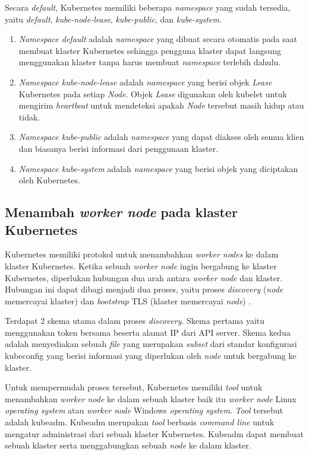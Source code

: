 Secara \emph{default}, Kubernetes memiliki beberapa \emph{namespace} yang sudah
tersedia, yaitu \emph{default}, \emph{kube-node-lease}, \emph{kube-public}, dan \emph{kube-system}.

\begin{enumerate}[itemsep=-0.2cm, topsep=-0.3cm]
  \item{\emph{Namespace default} adalah \emph{namespace} yang dibuat secara otomatis
      pada saat membuat klaster Kubernetes sehingga pengguna klaster dapat langsung
      menggunakan klaster tanpa harus membuat \emph{namespace} terlebih dahulu.
    }
  \item{\emph{Namespace kube-node-lease} adalah \emph{namespace} yang berisi objek \emph{Lease}
      Kubernetes pada setiap \emph{Node}. Objek \emph{Lease} digunakan oleh kubelet untuk
      mengirim \emph{heartbeat} untuk mendeteksi apakah \emph{Node} tersebut masih hidup atau tidak.
    }
  \item{\emph{Namespace kube-public} adalah \emph{namespace} yang dapat diakses oleh semua
      klien dan biasanya berisi informasi dari penggunaan klaster.
    }
  \item{\emph{Namespace kube-system} adalah \emph{namespace} yang berisi objek yang diciptakan
      oleh Kubernetes.
    }
\end{enumerate}

\subsection{Menambah \emph{worker node} pada klaster Kubernetes}

Kubernetes memiliki protokol untuk menambahkan \emph{worker nodes} ke dalam klaster Kubernetes.
Ketika sebuah \emph{worker node} ingin bergabung ke klaster Kubernetes, diperlukan hubungan
dua arah antara \emph{worker node} dan klaster. Hubungan ini dapat dibagi menjadi dua proses, yaitu
proses \emph{discovery} (\emph{node} memercayai klaster) dan \emph{bootstrap} TLS (klaster memercayai \emph{node}) \parencite{kubernetes-website-adding-linux-node}.

Terdapat 2 skema utama dalam proses \emph{discovery}. Skema pertama yaitu menggunakan token bersama beserta
alamat IP dari API server. Skema kedua adalah menyediakan sebuah \emph{file} yang merupakan
\emph{subset} dari standar konfigurasi kubeconfig yang berisi informasi yang diperlukan oleh
\emph{node} untuk bergabung ke klaster.

Untuk mempermudah proses tersebut, Kubernetes memiliki \emph{tool} untuk menambahkan \emph{worker node} ke dalam sebuah klaster
baik itu \emph{worker node} Linux \emph{operating system} atau \emph{worker node} Windows \emph{operating system}.
\emph{Tool} tersebut adalah kubeadm. Kubeadm merupakan \emph{tool} berbasis \emph{command line} untuk mengatur administrasi dari sebuah klaster
Kubernetes. Kubeadm dapat membuat sebuah klaster serta menggabungkan sebuah \emph{node} ke dalam klaster.

